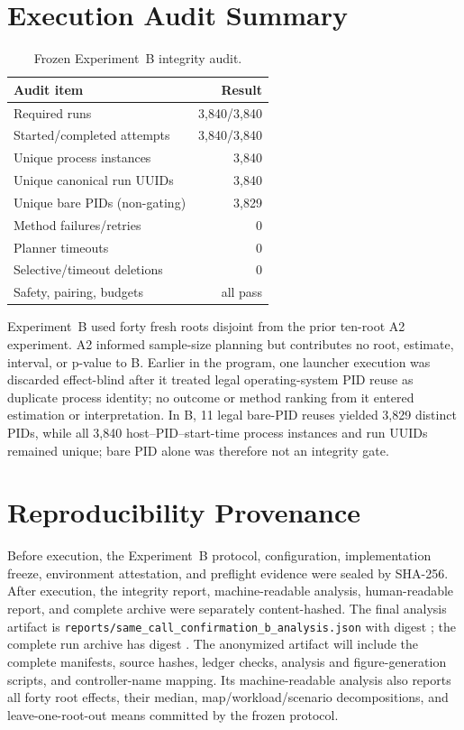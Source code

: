 \documentclass[sigconf,anonymous,review]{acmart}
\begin{document}



\appendix

\section{Execution Audit Summary}

\begin{table}[h]
\caption{Frozen Experiment~B integrity audit.}
\centering
\small
\begin{tabular}{lr}
\toprule
Audit item & Result \\
\midrule
Required runs & 3{,}840/3{,}840 \\
Started/completed attempts & 3{,}840/3{,}840 \\
Unique process instances & 3{,}840 \\
Unique canonical run UUIDs & 3{,}840 \\
Unique bare PIDs (non-gating) & 3{,}829 \\
Method failures/retries & 0 \\
Planner timeouts & 0 \\
Selective/timeout deletions & 0 \\
Safety, pairing, budgets & all pass \\
\bottomrule
\end{tabular}
\end{table}

Experiment~B used forty fresh roots disjoint from the prior ten-root A2
experiment. A2 informed sample-size planning but contributes no root, estimate,
interval, or p-value to B. Earlier in the program, one launcher execution was
discarded effect-blind after it treated legal operating-system PID reuse as
duplicate process identity; no outcome or method ranking from it entered
estimation or interpretation. In B, 11 legal bare-PID reuses yielded 3{,}829
distinct PIDs, while all 3{,}840 host--PID--start-time process instances and run
UUIDs remained unique; bare PID alone was therefore not an integrity gate.

\section{Reproducibility Provenance}

Before execution, the Experiment~B protocol, configuration, implementation
freeze, environment attestation, and preflight evidence were sealed by
SHA-256. After execution, the integrity report, machine-readable analysis,
human-readable report, and complete archive were separately content-hashed.
The final analysis artifact is
\texttt{reports/same\_call\_confirmation\_b\_analysis.json} with digest
\texttt{};
the complete run archive has digest
\texttt{}.
The anonymized artifact will include the complete manifests, source hashes,
ledger checks, analysis and figure-generation scripts, and controller-name
mapping. Its machine-readable analysis also reports all forty root effects,
their median, map/workload/scenario decompositions, and leave-one-root-out
means committed by the frozen protocol.
\end{document}
